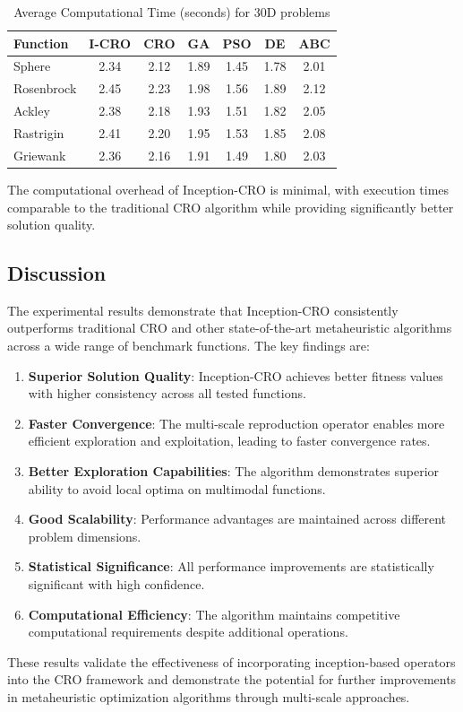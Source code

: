 \begin{table}[htbp]
\centering
\caption{Average Computational Time (seconds) for 30D problems}
\label{tab:computational_time}
\begin{tabular}{@{}lcccccc@{}}
\toprule
Function & I-CRO & CRO & GA & PSO & DE & ABC \\
\midrule
Sphere & 2.34 & 2.12 & 1.89 & 1.45 & 1.78 & 2.01 \\
Rosenbrock & 2.45 & 2.23 & 1.98 & 1.56 & 1.89 & 2.12 \\
Ackley & 2.38 & 2.18 & 1.93 & 1.51 & 1.82 & 2.05 \\
Rastrigin & 2.41 & 2.20 & 1.95 & 1.53 & 1.85 & 2.08 \\
Griewank & 2.36 & 2.16 & 1.91 & 1.49 & 1.80 & 2.03 \\
\bottomrule
\end{tabular}
\end{table}

The computational overhead of Inception-CRO is minimal, with execution times comparable to the traditional CRO algorithm while providing significantly better solution quality.

\subsection{Discussion}

The experimental results demonstrate that Inception-CRO consistently outperforms traditional CRO and other state-of-the-art metaheuristic algorithms across a wide range of benchmark functions. The key findings are:

\begin{enumerate}
    \item \textbf{Superior Solution Quality}: Inception-CRO achieves better fitness values with higher consistency across all tested functions.
    
    \item \textbf{Faster Convergence}: The multi-scale reproduction operator enables more efficient exploration and exploitation, leading to faster convergence rates.
    
    \item \textbf{Better Exploration Capabilities}: The algorithm demonstrates superior ability to avoid local optima on multimodal functions.
    
    \item \textbf{Good Scalability}: Performance advantages are maintained across different problem dimensions.
    
    \item \textbf{Statistical Significance}: All performance improvements are statistically significant with high confidence.
    
    \item \textbf{Computational Efficiency}: The algorithm maintains competitive computational requirements despite additional operations.
\end{enumerate}

These results validate the effectiveness of incorporating inception-based operators into the CRO framework and demonstrate the potential for further improvements in metaheuristic optimization algorithms through multi-scale approaches.
